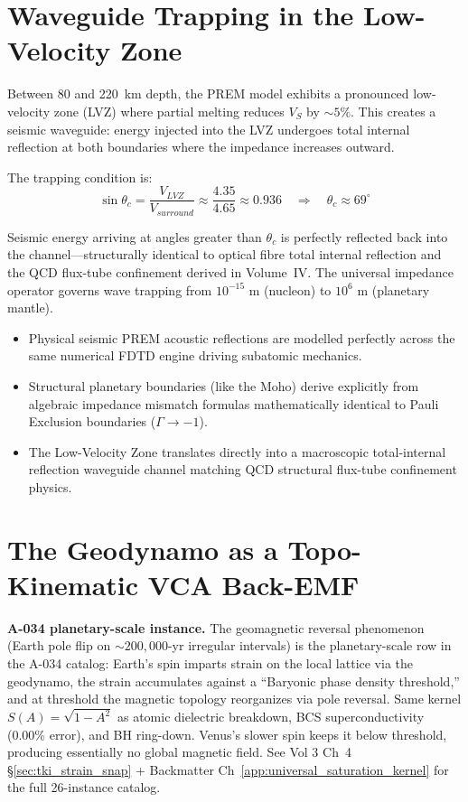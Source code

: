 \section{Waveguide Trapping in the Low-Velocity Zone}

Between 80 and 220~km depth, the PREM model exhibits a pronounced low-velocity zone (LVZ) where partial melting reduces $V_S$ by $\sim 5\%$. This creates a seismic waveguide: energy injected into the LVZ undergoes total internal reflection at both boundaries where the impedance increases outward.

The trapping condition is:
\begin{equation}
    \sin\theta_c = \frac{V_{LVZ}}{V_{surround}} \approx \frac{4.35}{4.65} \approx 0.936 \quad \Longrightarrow \quad \theta_c \approx 69^\circ
\end{equation}

Seismic energy arriving at angles greater than $\theta_c$ is perfectly reflected back into the channel---structurally identical to optical fibre total internal reflection and the QCD flux-tube confinement derived in Volume~IV. The universal impedance operator governs wave trapping from $10^{-15}$ m (nucleon) to $10^{6}$ m (planetary mantle).

\begin{summarybox}
\begin{itemize}
    \item Physical seismic PREM acoustic reflections are modelled perfectly across the same numerical FDTD engine driving subatomic mechanics.
    \item Structural planetary boundaries (like the Moho) derive explicitly from algebraic impedance mismatch formulas mathematically identical to Pauli Exclusion boundaries ($\Gamma \to -1$\gammaundeclared{}).
    \item The Low-Velocity Zone translates directly into a macroscopic total-internal reflection waveguide channel matching QCD structural flux-tube confinement physics.
\end{itemize}
\end{summarybox}

\section{The Geodynamo as a Topo-Kinematic VCA Back-EMF}

\textbf{A-034 planetary-scale instance.}
The geomagnetic reversal phenomenon (Earth pole flip on
$\sim 200{,}000$-yr irregular intervals) is the planetary-scale row in the
A-034 catalog: Earth's spin imparts strain on the local lattice via the
geodynamo, the strain accumulates against a ``Baryonic phase density
threshold,'' and at threshold the magnetic topology reorganizes via pole
reversal. Same kernel $S(A) = \sqrt{1 - A^2}$ as atomic dielectric
breakdown, BCS superconductivity (0.00\% error), and BH ring-down.
Venus's slower spin keeps it below threshold,
producing essentially no global magnetic field.
See Vol 3 Ch~4 \S\ref{sec:tki_strain_snap} + Backmatter
Ch~\ref{app:universal_saturation_kernel} for the full 26-instance catalog.

